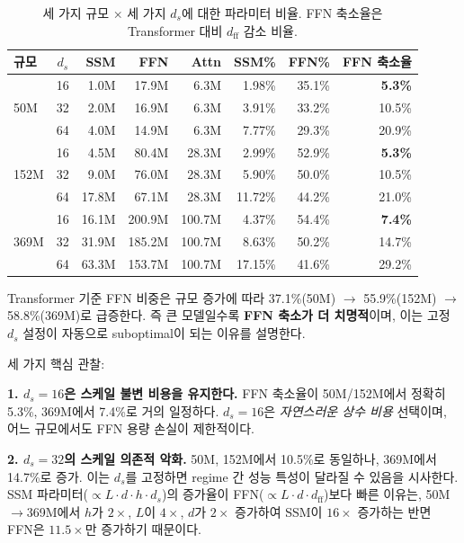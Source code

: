 \documentclass[11pt]{article}
\begin{document}
\begin{table}[h]
\centering\small
\caption{세 가지 규모 × 세 가지 $d_s$에 대한 파라미터 비율. FFN 축소율은 Transformer 대비 $d_{\text{ff}}$ 감소 비율.}
\label{tab:ffn_ratio}
\begin{tabular}{l|c|rrr|rr|r}
\toprule
\textbf{규모} & \textbf{$d_s$} & \textbf{SSM} & \textbf{FFN} & \textbf{Attn} & \textbf{SSM\%} & \textbf{FFN\%} & \textbf{FFN 축소율} \\
\midrule
\multirow{3}{*}{50M}  & 16 & 1.0M & 17.9M & 6.3M & 1.98\% & 35.1\% & \textbf{5.3\%} \\
                      & 32 & 2.0M & 16.9M & 6.3M & 3.91\% & 33.2\% & 10.5\% \\
                      & 64 & 4.0M & 14.9M & 6.3M & 7.77\% & 29.3\% & 20.9\% \\
\midrule
\multirow{3}{*}{152M} & 16 & 4.5M & 80.4M & 28.3M & 2.99\% & 52.9\% & \textbf{5.3\%} \\
                      & 32 & 9.0M & 76.0M & 28.3M & 5.90\% & 50.0\% & 10.5\% \\
                      & 64 & 17.8M & 67.1M & 28.3M & 11.72\% & 44.2\% & 21.0\% \\
\midrule
\multirow{3}{*}{369M} & 16 & 16.1M & 200.9M & 100.7M & 4.37\% & 54.4\% & \textbf{7.4\%} \\
                      & 32 & 31.9M & 185.2M & 100.7M & 8.63\% & 50.2\% & 14.7\% \\
                      & 64 & 63.3M & 153.7M & 100.7M & 17.15\% & 41.6\% & 29.2\% \\
\bottomrule
\end{tabular}
\end{table}

Transformer 기준 FFN 비중은 규모 증가에 따라 37.1\%(50M) $\to$ 55.9\%(152M) $\to$ 58.8\%(369M)로 급증한다. 즉 큰 모델일수록 \textbf{FFN 축소가 더 치명적}이며, 이는 고정 $d_s$ 설정이 자동으로 suboptimal이 되는 이유를 설명한다.

세 가지 핵심 관찰:

\textbf{1. $d_s = 16$은 스케일 불변 비용을 유지한다.} FFN 축소율이 50M/152M에서 정확히 5.3\%, 369M에서 7.4\%로 거의 일정하다. $d_s = 16$은 \textit{자연스러운 상수 비용} 선택이며, 어느 규모에서도 FFN 용량 손실이 제한적이다.

\textbf{2. $d_s = 32$의 스케일 의존적 악화.} 50M, 152M에서 10.5\%로 동일하나, 369M에서 14.7\%로 증가. 이는 $d_s$를 고정하면 regime 간 성능 특성이 달라질 수 있음을 시사한다. SSM 파라미터($\propto L \cdot d \cdot h \cdot d_s$)의 증가율이 FFN($\propto L \cdot d \cdot d_{\text{ff}}$)보다 빠른 이유는, 50M$\to$369M에서 $h$가 $2\times$, $L$이 $4\times$, $d$가 $2\times$ 증가하여 SSM이 $16\times$ 증가하는 반면 FFN은 $11.5\times$만 증가하기 때문이다.
\end{document}

